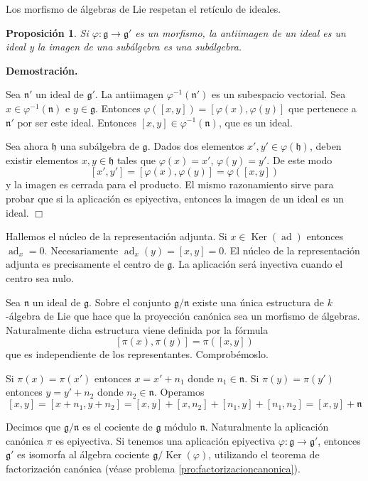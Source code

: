 \documentclass[a4paper,draft,12pt]{article}
\newtheorem{propo}[teo]{Proposición}%
\newcommand{\dem}{\noindent \textbf{Demostración. }\vspace{0.3 cm}}%
\newcommand{\g}{\mathfrak{g}}%
\newcommand{\fin}{ $\Box $ \vspace{0.4 cm}}
\newcommand{\df}[1]{\textsf{\color{blue}#1}}
\DeclareMathOperator{\Ker}{Ker}%
\DeclareMathOperator{\ad}{ad}  %
\begin{document}
Los morfismo de álgebras de Lie respetan el retículo de ideales.




\begin{propo}
 Si $\varphi : \g \rightarrow   \g'$   es un morfismo, la antiimagen de un ideal es un ideal y la imagen de una subálgebra es una subálgebra.
 
\end{propo}

\dem


Sea $\mathfrak{n}'$ un ideal de $\g'$.  La antiimagen $\varphi^{-1}(\mathfrak{n}')$ es un subespacio vectorial.  Sea $x \in \varphi^{-1}(\mathfrak{n})$ e $y \in \g$.  Entonces $\varphi([x,y])= [\varphi(x), \varphi(y)]$ que pertenece a $\mathfrak{n}'$ por ser este ideal.  Entonces $[x,y] \in \varphi^{-1}(\mathfrak{n})$, que es un ideal.

\bigskip

Sea ahora $\mathfrak{h}$ una subálgebra de $\g$.  Dados dos elementos $x',y'\in \varphi(\mathfrak{h})$, deben existir elementos $x,y \in \mathfrak{h}$ tales que $\varphi(x)=x'$, $\varphi(y)=y'$.  De este modo 
$$
[x',y']= [\varphi(x),\varphi(y)] =\varphi([x,y])
$$
 y la imagen es cerrada para el producto.  El mismo razonamiento sirve para probar que si la aplicación es epiyectiva, entonces la imagen de un ideal es un ideal. \fin
 
 
 Hallemos el núcleo de la representación adjunta. Si $x \in \Ker(\ad)$ entonces $\ad_x=0$.  Necesariamente $\ad_x(y)= [x,y]=0$. El núcleo de la representación adjunta es precisamente el centro de $\g$.  La aplicación será inyectiva cuando el centro sea nulo.
 
 \bigskip


Sea  $\mathfrak{n}$  un ideal de $\g$. Sobre el conjunto $\g/\mathfrak{n}$ existe una única estructura de $k$-álgebra de Lie que hace que la proyección canónica   sea un morfismo de álgebras.
Naturalmente dicha estructura viene definida por la fórmula
$$
[\pi(x), \pi(y)] = \pi([x,y])
$$
que es independiente de los representantes. Comprobémoslo.

Si $\pi(x) = \pi(x')$ entonces $x= x'+n_1$ donde $n_1 \in \mathfrak{n}$. Si $\pi(y) = \pi(y')$ entonces $y= y'+n_2$ donde $n_2 \in \mathfrak{n}$. Operamos
$$
[x,y]= [x+n_1,y+n_2]= [x,y]+ [x,n_2]+[n_1,y] +[n_1,n_2] = [x,y]+ \mathfrak{n}
$$

Decimos que $\g/\mathfrak{n}$ es el  \df{cociente}  de $\g$ módulo $\mathfrak{n}$. Naturalmente la aplicación canónica $\pi$ es epiyectiva.  Si tenemos una aplicación epiyectiva $\varphi: \g \rightarrow \g'$, entonces $\g'$ es isomorfa al álgebra cociente $\g/\Ker(\varphi)$, utilizando el teorema de factorización canónica (véase problema \ref{pro:factorizacioncanonica}).
\end{document}
